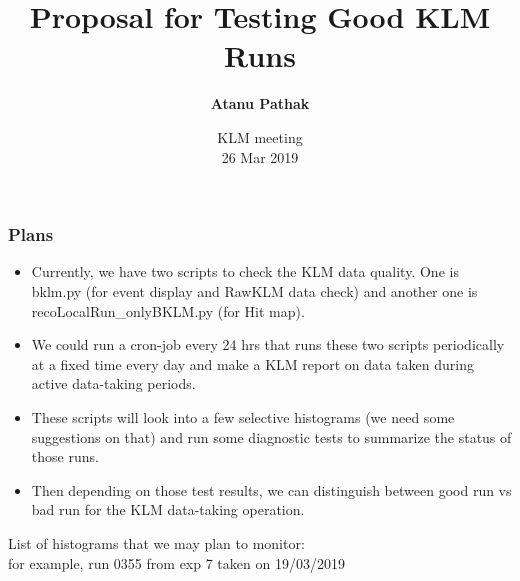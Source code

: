 \documentclass{beamer}
\title{Proposal for Testing Good KLM Runs} %
\author{{\bf Atanu Pathak} \\}
\institute{\begin{minipage}{0.5\textwidth}\centering
\texttt{[image: /afs/cern.ch/user/s/swaban/public/university-of-louisville-logo.png]}
\end{minipage}}
\date {{KLM meeting}\\26 Mar 2019}
\begin{document}
\begin{frame}
\titlepage %
\end{frame}
\begin{frame}
\frametitle{Plans}
\vspace*{0.2cm}
\begin{center}
  
\begin{itemize} 
\item {\small Currently, we have two scripts to check the KLM data quality. One is bklm.py (for event display and RawKLM data check) and another one is recoLocalRun\_onlyBKLM.py (for Hit map).}
\item {\small  We could run a cron-job every 24 hrs that runs these two scripts periodically at a fixed time every day and make a KLM report on data taken during active data-taking periods.}
\item {\small  These scripts will look into a few selective histograms (we need some suggestions on that) and run some diagnostic tests to summarize the status of those runs.}
\item {\small  Then depending on those test results, we can distinguish between good run vs bad run for the KLM data-taking operation.}
\end{itemize}

\end{center}
\end{frame}
\begin{frame}
\begin{center}
\begin{Large}
  List of histograms that we may plan to monitor: \\
  \small {for example, run 0355 from exp 7 taken on 19/03/2019}
\end{Large}
\end{center}
\end{frame}
\end{document}
